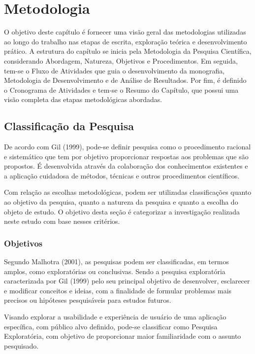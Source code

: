 \chapter[Metodologia]{Metodologia}
O objetivo deste capítulo é fornecer uma visão geral das metodologias utilizadas ao longo do trabalho nas etapas de escrita, exploração teórica e desenvolvimento prático. 
A estrutura do capítulo se inicia pela Metodologia da Pesquisa Científica, considerando Abordagem, Natureza, Objetivos e Procedimentos. Em seguida, tem-se o Fluxo de Atividades que guia o desenvolvimento  
da monografia, Metodologia de Desenvolvimento e de Análise de Resultados. Por fim, é definido o Cronograma de Atividades e tem-se o Resumo do Capítulo, que possui uma visão completa das etapas 
metodológicas abordadas.

\section{Classificação da Pesquisa}
\label{sec:Classificação da Pesquisa}
De acordo com Gil (1999), pode-se definir pesquisa como o procedimento racional e sistemático que tem por objetivo proporcionar respostas aos problemas que são propostos. É desenvolvida através da colaboração 
dos conhecimentos existentes e a aplicação cuidadosa de métodos, técnicas e outros procedimentos científicos.

Com relação as escolhas metodológicas, podem ser utilizadas classificações quanto ao objetivo da pesquisa, quanto a natureza da pesquisa e quanto a escolha do objeto de estudo. O objetivo desta seção é 
categorizar a investigação realizada neste estudo com base nesses critérios.

\subsection{Objetivos}
\label{sec:Objetivos2}
Segundo Malhotra (2001), as pesquisas podem ser classificadas, em termos amplos, como exploratórias ou conclusivas. Sendo a pesquisa exploratória caracterizada por Gil (1999) pelo seu principal objetivo de 
desenvolver, esclarecer e modificar conceitos e ideias, com a finalidade de formular problemas mais precisos ou hipóteses pesquisáveis para estudos futuros.

Visando explorar a usabilidade e experiência de usuário de uma aplicação específica, com público alvo definido, pode-se classificar como Pesquisa Exploratória, com objetivo de proporcionar maior familiaridade 
com o assunto pesquisado.

